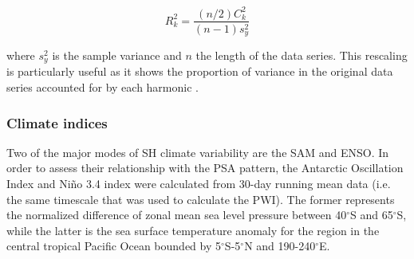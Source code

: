 \begin{equation}\label{eq:variance_explained}
R_k^2 = \frac{(n/2)C_k^2}{(n-1)s_y^2}
\end{equation}

\noindent where $s_y^2$ is the sample variance and $n$ the length of the data series. This rescaling is particularly useful as it shows the proportion of variance in the original data series accounted for by each harmonic \citep{Wilks2011}.

\subsubsection{Climate indices}
Two of the major modes of SH climate variability are the SAM and ENSO. In order to assess their relationship with the PSA pattern, the Antarctic Oscillation Index \citep[AOI;][]{Gong1999} and Ni\~{n}o 3.4 index \citep{Trenberth2001} were calculated from 30-day running mean data (i.e. the same timescale that was used to calculate the PWI). The former represents the normalized difference of zonal mean sea level pressure between 40$^{\circ}$S and 65$^{\circ}$S, while the latter is the sea surface temperature anomaly for the region in the central tropical Pacific Ocean bounded by 5$^{\circ}$S-5$^{\circ}$N and 190-240$^{\circ}$E. 


